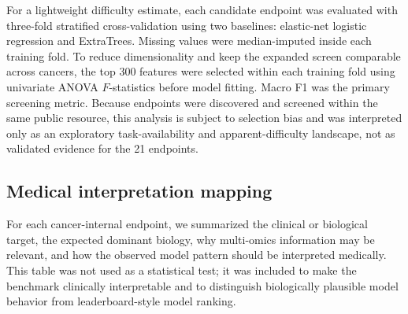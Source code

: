 For a lightweight difficulty estimate, each candidate endpoint was evaluated with three-fold stratified cross-validation using two baselines: elastic-net logistic regression and ExtraTrees. Missing values were median-imputed inside each training fold. To reduce dimensionality and keep the expanded screen comparable across cancers, the top 300 features were selected within each training fold using univariate ANOVA \(F\)-statistics before model fitting. Macro F1 was the primary screening metric. Because endpoints were discovered and screened within the same public resource, this analysis is subject to selection bias and was interpreted only as an exploratory task-availability and apparent-difficulty landscape, not as validated evidence for the 21 endpoints.

\subsection{Medical interpretation mapping}

For each cancer-internal endpoint, we summarized the clinical or biological target, the expected dominant biology, why multi-omics information may be relevant, and how the observed model pattern should be interpreted medically. This table was not used as a statistical test; it was included to make the benchmark clinically interpretable and to distinguish biologically plausible model behavior from leaderboard-style model ranking.
